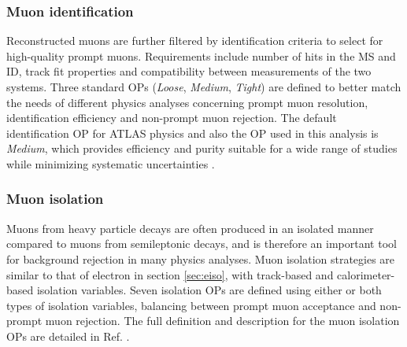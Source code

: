 \documentclass[../thesis.tex]{subfiles}
\begin{document}
\subsubsection*{Muon identification}
Reconstructed muons are further filtered by identification criteria to select for high-quality prompt muons. Requirements include number of hits in the \acs{MS} and \acs{ID}, track fit properties and compatibility between measurements of the two systems. Three standard \acs{OP}s (\textit{Loose}, \textit{Medium}, \textit{Tight}) are defined to better match the needs of different physics analyses concerning prompt muon \pT resolution, identification efficiency and non-prompt muon rejection. The default identification \acs{OP} for ATLAS physics and also the \acs{OP} used in this analysis is \textit{Medium}, which provides efficiency and purity suitable for a wide range of studies while minimizing systematic uncertainties \citep{reco:muon_ID}.


\subsubsection*{Muon isolation}
Muons from heavy particle decays are often produced in an isolated manner compared to muons from semileptonic decays, and is therefore an important tool for background rejection in many physics analyses. Muon isolation strategies are similar to that of electron in section \ref{sec:eiso}, with track-based and calorimeter-based isolation variables. Seven isolation \acs{OP}s are defined using either or both types of isolation variables, balancing between prompt muon acceptance and non-prompt muon rejection. The full definition and description for the muon isolation \acs{OP}s are detailed in Ref. \citep{reco:muon_ID}.
\end{document}
